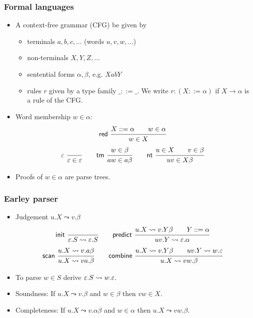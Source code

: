 \documentclass[t,fleqn,usenames,dvipsnames]{beamer}
\begin{document}
\begin{frame}%
  \frametitle{Formal languages}
  \vspace{-3ex}
  \begin{itemize}
  \item A context-free grammar (CFG) be given by
    \begin{itemize}
    \item terminals $a,b,c,\dots$ (words $u,v,w,\dots$)
    \item non-terminals $X,Y,Z,\dots$
    \item sentential forms $\alpha,\beta$, e.g. $XabY$
    \item rules $r$ given by a type family $\_ ::= \_$.  We write
  $r : (X ::= \alpha)$ if $X \to \alpha$ is a rule of the CFG.
    \end{itemize}
  \item Word membership $w \in \alpha$:
    \begin{gather*}
  \nru{\tred}{X ::= \alpha \qquad w \in \alpha}{w \in X}
\\
  \nru{\Ge}{}{\Ge \in \Ge}
\qquad
  \nru{\ttm}{w \in \beta}{aw \in a\beta}
\qquad
  \nru{\tnt}{u \in X \qquad v \in \beta}{uv \in X\beta}
    \end{gather*}
  \item Proofs of $w \in \alpha$ are parse trees.
  \end{itemize}
\end{frame}

\newcommand{\tinit}{\mathsf{init}}
\newcommand{\tpredict}{\mathsf{predict}}
\newcommand{\tscan}{\mathsf{scan}}
\newcommand{\tcombine}{\mathsf{combine}}
\newcommand{\expto}{\leadsto}

\begin{frame}%
  \frametitle{Earley parser}
  \vspace{-3ex}
  \begin{itemize}
  \item Judgement $u.X\expto{}v.\beta$
    \begin{gather*}
\nru{\tinit}{}{\Ge.S\expto{}\Ge.S}
\qquad
\nru{\tpredict}{u.X \expto{} v.Y\beta \qquad Y ::= \alpha}{uv.Y \expto{} \Ge.\alpha}
\\
\nru{\tscan}{u.X \expto{} v.a\beta}{u.X \expto{} va.\beta}
\qquad
\nru{\tcombine}{u.X \expto{} v.Y\beta \qquad uv.Y \expto{} w.\Ge}{u.X \expto{} vw.\beta}
    \end{gather*}
  \item To parse $w \in S$ derive $\Ge.S \expto{} w.\Ge$.
  \item Soundness:  If $u.X \expto{} v.\beta$ and $w \in \beta$
    then $vw \in X$.
  \item Completeness: If $u.X \expto{} v.\alpha\beta$ and $w \in \alpha$
    then $u.X \expto{} vw.\beta$.
  \end{itemize}
\end{frame}
\end{document}

